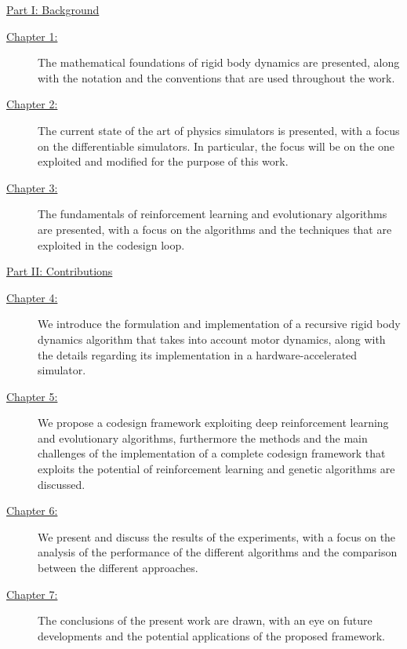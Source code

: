 \begin{description}

    \item{\hyperref[part:background]{Part I: Background}}

          \begin{description}
              \item[{\hyperref[chp:back_RBDynamics]{Chapter 1:}}] The mathematical foundations of rigid body dynamics are presented, along with the notation and the conventions that are used throughout the work.
              \item[{\hyperref[chp:back_PhysicsSimulators]{Chapter 2:}}] The current state of the art of physics simulators is presented, with a focus on the differentiable simulators. In particular, the focus will be on the one exploited and modified for the purpose of this work.
              \item [{\hyperref[chp:back_RLGA]{Chapter 3:}}] The fundamentals of reinforcement learning and evolutionary algorithms are presented, with a focus on the algorithms and the techniques that are exploited in the codesign loop.
          \end{description}

    \item{\hyperref[part:contributions]{Part II: Contributions}}

          \begin{description}
              \item[{\hyperref[chp:contrib_ABA]{Chapter 4:}}] We introduce the formulation and implementation of a recursive rigid body dynamics algorithm that takes into account motor dynamics, along with the details regarding its implementation in a hardware-accelerated simulator.
              \item[{\hyperref[chp:contrib_CodesignRL]{Chapter 5:}}] We propose a codesign framework exploiting deep reinforcement learning and evolutionary algorithms, furthermore the methods and the main challenges of the implementation of a complete codesign framework that exploits the potential of reinforcement learning and genetic algorithms are discussed.
              \item[{\hyperref[chp:contrib_ResultsDiscussion]{Chapter 6:}}] We present and discuss the results of the experiments, with a focus on the analysis of the performance of the different algorithms and the comparison between the different approaches.
              \item[{\hyperref[chp:contrib_Conclusions]{Chapter 7:}}] The conclusions of the present work are drawn, with an eye on future developments and the potential applications of the proposed framework.
          \end{description}
\end{description}
